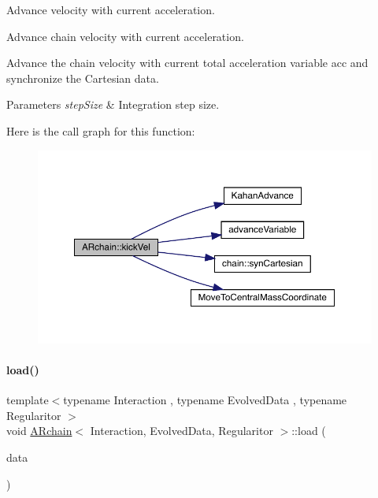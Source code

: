 Advance velocity with current acceleration. 

Advance chain velocity with current acceleration.

Advance the chain velocity with current total acceleration variable \textquotesingle{}acc\textquotesingle{} and synchronize the Cartesian data. 
\begin{DoxyParams}{Parameters}
{\em step\+Size} & Integration step size. \\
\hline
\end{DoxyParams}
Here is the call graph for this function\+:\nopagebreak
\begin{figure}[H]
\begin{center}
\leavevmode
\includegraphics[width=350pt]{class_a_rchain_a0b073cd82321047d7fafda59cef998ef_cgraph}
\end{center}
\end{figure}
\mbox{\label{class_a_rchain_a7edf1240a094d55df222c816659dced0}} 
\paragraph{\texorpdfstring{load()}{load()}}
{\footnotesize\ttfamily template$<$typename Interaction , typename Evolved\+Data , typename Regularitor $>$ \\
void \mbox{\hyperlink{class_a_rchain}{A\+Rchain}}$<$ Interaction, Evolved\+Data, Regularitor $>$\+::load (\begin{DoxyParamCaption}\item[{\mbox{\hyperlink{class_a_rchain_a829aca51411c08ffd518294770a374d5}{Plain\+Array}} \&}]{data }\end{DoxyParamCaption})}




